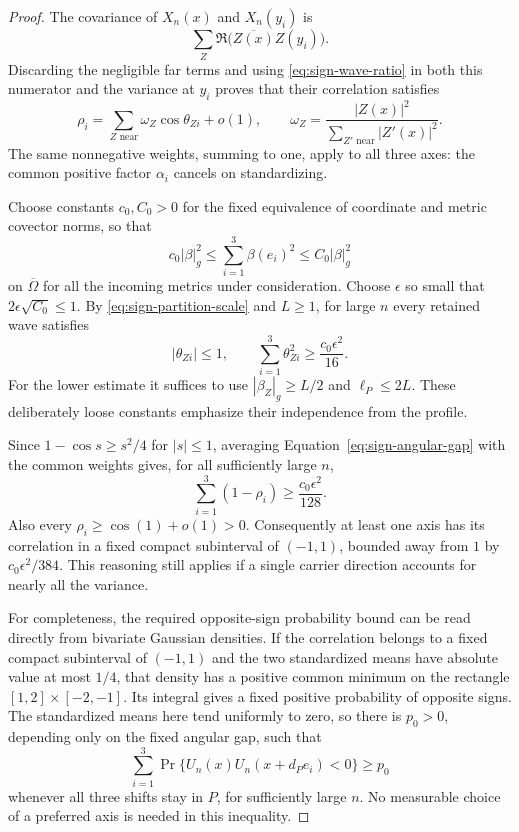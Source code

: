 \begin{proof}
The covariance of $X_n(x)$ and $X_n(y_i)$ is
\[
 \sum_Z\Re\bigl(\overline{Z(x)}Z(y_i)\bigr).
\]
Discarding the negligible far terms and using
\eqref{eq:sign-wave-ratio} in both this numerator and the
variance at $y_i$ proves that their correlation satisfies
\begin{equation}
 \rho_i=\sum_{Z\text{ near}}\omega_Z\cos\theta_{Zi}+o(1),
 \qquad
 \omega_Z=\frac{|Z(x)|^2}
                  {\sum_{Z'\text{ near}}|Z'(x)|^2}.
 \label{eq:sign-common-weights}
\end{equation}
The same nonnegative weights, summing to one, apply to all three
axes: the common positive factor $\alpha_i$ cancels on standardizing.

Choose constants $c_0,C_0>0$ for the fixed equivalence of coordinate
and metric covector norms, so that
\[
 c_0|\beta|_g^2\le\sum_{i=1}^3\beta(e_i)^2
                         \le C_0|\beta|_g^2
\]
on $\overline\Omega$ for all the incoming metrics under consideration.
Choose $\epsilon$ so small that $2\epsilon\sqrt{C_0}\le1$.
By \eqref{eq:sign-partition-scale} and $L\ge1$, for large $n$
every retained wave satisfies
\begin{equation}
 |\theta_{Zi}|\le1,\qquad
 \sum_{i=1}^3\theta_{Zi}^2\ge\frac{c_0\epsilon^2}{16}.
 \label{eq:sign-angular-gap}
\end{equation}
For the lower estimate it suffices to use
$|\beta_Z|_g\ge L/2$ and $\ell_P\le2L$.  These deliberately loose
constants emphasize their independence from the profile.

Since $1-\cos s\ge s^2/4$ for $|s|\le1$, averaging
Equation~\eqref{eq:sign-angular-gap} with the common weights gives,
for all sufficiently large $n$,
\[
 \sum_{i=1}^3(1-\rho_i)\ge\frac{c_0\epsilon^2}{128}.
\]
Also every $\rho_i\ge\cos(1)+o(1)>0$.  Consequently at least one
axis has its correlation in a fixed compact subinterval of $(-1,1)$,
bounded away from $1$ by $c_0\epsilon^2/384$.  This reasoning still
applies if a single carrier direction accounts for nearly all the
variance.

For completeness, the required opposite-sign probability bound can
be read directly from bivariate Gaussian densities.  If the
correlation belongs to a fixed compact subinterval of $(-1,1)$ and
the two standardized means have absolute value at most $1/4$, that
density has a positive common minimum on the rectangle
$[1,2]\times[-2,-1]$.  Its integral gives a fixed positive probability
of opposite signs.  The standardized means here tend uniformly to
zero, so there is $p_0>0$, depending only on the fixed angular gap,
such that
\[
 \sum_{i=1}^3
   \Pr\{U_n(x)U_n(x+d_Pe_i)<0\}\ge p_0
\]
whenever all three shifts stay in $P$, for sufficiently large $n$.
No measurable choice of a preferred axis is needed in this inequality.


\end{proof}
